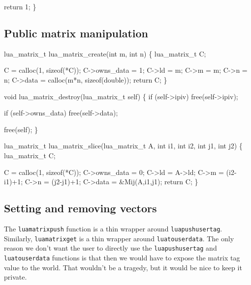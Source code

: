     return 1;
\}

\nwendcode{}\nwdocspar


\subsection{Public matrix manipulation}

\nwenddocs{}\endmoddef
lua_matrix_t lua_matrix_create(int m, int n)
\{
    lua_matrix_t C;

    C = calloc(1, sizeof(*C));
    C->owns_data = 1;
    C->ld = m;
    C->m  = m;
    C->n  = n;
    C->data = calloc(m*n, sizeof(double));
    return C;
\}

void lua_matrix_destroy(lua_matrix_t self)
\{
    if (self->ipiv)
        free(self->ipiv);

    if (self->owns_data)
        free(self->data);

    free(self);
\}

\nwendcode{}\nwdocspar

\nwenddocs{}\plusendmoddef
lua_matrix_t lua_matrix_slice(lua_matrix_t A, int i1, int i2, int j1, int j2)
\{
    lua_matrix_t C;

    C = calloc(1, sizeof(*C));
    C->owns_data = 0;
    C->ld   = A->ld;
    C->m    = (i2-i1)+1;
    C->n    = (j2-j1)+1;
    C->data = &Mij(A,i1,j1);
    return C;
\}

\nwendcode{}\nwdocspar

\subsection{Setting and removing vectors}

The {\tt{}lua{}matrix{}push} function is a thin wrapper around
{\tt{}lua{}pushusertag}.  Similarly, {\tt{}lua{}matrix{}get} is a
thin wrapper around {\tt{}lua{}touserdata}.  The only reason we
don't want the user to directly use the {\tt{}lua{}pushusertag} and 
{\tt{}lua{}touserdata} functions is that then we would have
to expose the matrix tag value to the world.  That wouldn't
be a tragedy, but it would be nice to keep it private.

